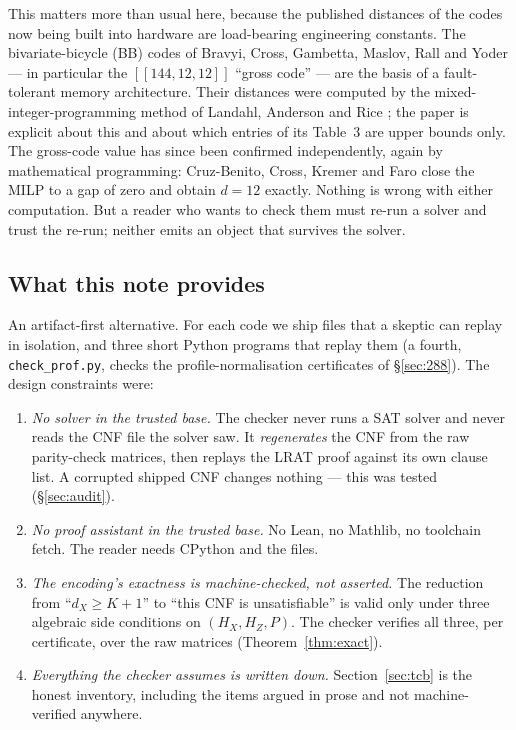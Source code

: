 \documentclass[11pt]{amsart}
\newcommand{\HX}{H_{X}}
\newcommand{\HZ}{H_{Z}}
\newcommand{\dX}{d_{X}}
\newcommand{\gross}{[[144,12,12]]}
\theoremstyle{plain}
\theoremstyle{definition}
\theoremstyle{remark}
\begin{document}
This matters more than usual here, because the published distances of the
codes now being built into hardware are load-bearing engineering constants.
The bivariate-bicycle (BB) codes of Bravyi, Cross, Gambetta, Maslov, Rall and
Yoder \cite{BCGMRY} --- in particular the $\gross$ ``gross code'' --- are the
basis of a fault-tolerant memory architecture. Their distances were computed
by the mixed-integer-programming method of Landahl, Anderson and Rice
\cite{LandahlAndersonRice}; the paper is explicit about this and about which
entries of its Table~3 are upper bounds only. The gross-code value has since
been confirmed independently, again by mathematical programming: Cruz-Benito,
Cross, Kremer and Faro \cite{CruzBenito} close the MILP to a gap of zero and
obtain $d=12$ exactly. Nothing is wrong with either computation. But a reader
who wants to check them must re-run a solver and trust the re-run; neither
emits an object that survives the solver.

\subsection{What this note provides}
An artifact-first alternative. For each code we ship files that a skeptic can
replay in isolation, and three short Python programs that replay them (a fourth,
\texttt{check\_prof.py}, checks the profile-normalisation certificates of
\S\ref{sec:288}). The design constraints were:

\begin{enumerate}
\item[(i)] \emph{No solver in the trusted base.} The checker never runs a SAT
solver and never reads the CNF file the solver saw. It \emph{regenerates} the
CNF from the raw parity-check matrices, then replays the LRAT proof against
its own clause list. A corrupted shipped CNF changes nothing --- this was
tested (\S\ref{sec:audit}).
\item[(ii)] \emph{No proof assistant in the trusted base.} No Lean, no
Mathlib, no toolchain fetch. The reader needs CPython and the files.
\item[(iii)] \emph{The encoding's exactness is machine-checked, not asserted.}
The reduction from ``$\dX\ge K+1$'' to ``this CNF is unsatisfiable'' is valid
only under three algebraic side conditions on $(\HX,\HZ,P)$. The checker
verifies all three, per certificate, over the raw matrices
(Theorem~\ref{thm:exact}).
\item[(iv)] \emph{Everything the checker assumes is written down.}
Section~\ref{sec:tcb} is the honest inventory, including the items argued in
prose and not machine-verified anywhere.
\end{enumerate}
\end{document}
